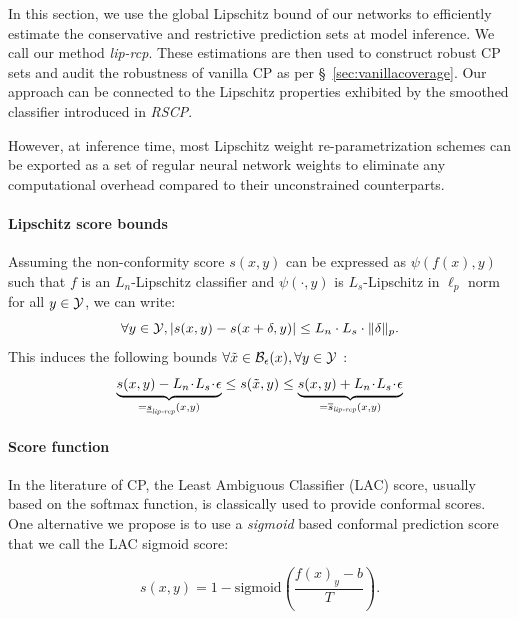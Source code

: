 In this section, we use the global Lipschitz bound of our networks to efficiently estimate the conservative and restrictive prediction sets at model inference. We call our method \emph{lip-rcp}. These estimations are then used to construct robust CP sets and audit the robustness of vanilla CP as per \S~\ref{sec:vanillacoverage}. 
Our approach can be connected to the Lipschitz properties exhibited by the smoothed classifier introduced in \emph{RSCP}. 

However, at inference time, most Lipschitz weight re-parametrization schemes can be exported as a set of regular neural network weights to eliminate any computational overhead compared to their unconstrained counterparts.


\paragraph{Lipschitz score bounds} Assuming the non-conformity score $s(x,y)$ can be expressed as $\psi(f(x),y)$ such that $f$ is an $L_n$-Lipschitz classifier and $\psi(\cdot,y)$ is $L_s$-Lipschitz in $\ell_p$ norm for all $y \in \mathcal{Y}$, we can write: 
\begin{equation}
    \forall y \in \mathcal{Y}, | s(x, y) - s(x+\delta,y) | \leq L_n \cdot L_s \cdot \| \delta \|_p. 
\end{equation}
%
This induces the following bounds $\forall \Tilde{x} \in \mathcal{B}_\epsilon(x), \forall y \in \mathcal{Y}$ : 
%
\begin{equation}
    \underbrace{s(x,y) - L_n \! \cdot \! L_s \! \cdot \! \epsilon}_{=\underline{s}_\emph{lip-rcp}(x,y)} \leq s(\Tilde{x},y) \leq \underbrace{s(x,y) + L_n \! \cdot \! L_s \! \cdot \! \epsilon}_{=\overline{s}_\emph{lip-rcp}(x,y)}
\label{eq:lipschitz_ineq}
\end{equation}
%
\paragraph{Score function} 
In the literature of CP, the Least Ambiguous Classifier (LAC) score, usually based on the softmax function, is classically used to provide conformal scores. 
One alternative we propose is to use a \textit{sigmoid} based conformal prediction score that we call the LAC sigmoid score:

\begin{equation}
    s(x,y) = 1 - \text{sigmoid}\left(\frac{f(x)_y - b}{T}\right).
\label{eq:sig_score}
\end{equation}

